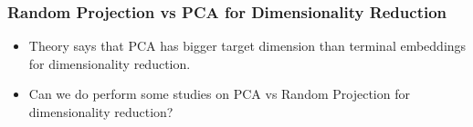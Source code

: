 \subsubsection*{Random Projection vs PCA for Dimensionality Reduction}
\begin{itemize}
    \item Theory says that PCA has bigger target dimension than terminal embeddings for dimensionality reduction.
    \item Can we do perform some studies on PCA vs Random Projection for dimensionality reduction?
\end{itemize}